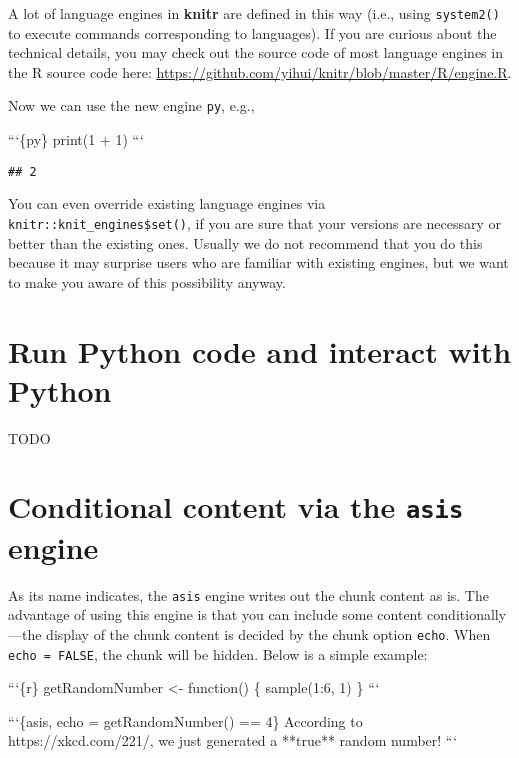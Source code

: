 \documentclass[
  11pt,
]{krantz}
\newenvironment{Shaded}{\begin{snugshade}}{\end{snugshade}}
\newcommand{\BaseNTok}[1]{\textcolor[rgb]{0.06,0.06,0.06}{#1}}
\renewenvironment{quote}{\begin{VF}}{\end{VF}}
\begin{document}
A lot of language engines in \textbf{knitr} are defined in this way (i.e., using \texttt{system2()} to execute commands corresponding to languages). If you are curious about the technical details, you may check out the source code of most language engines in the R source code here: \url{https://github.com/yihui/knitr/blob/master/R/engine.R}.

Now we can use the new engine \texttt{py}, e.g.,

\begin{quote}
\begin{Shaded}
\begin{Highlighting}[]
\BaseNTok{```\{py\}}
\BaseNTok{print(1 + 1)}
\BaseNTok{```}
\end{Highlighting}
\end{Shaded}

\begin{verbatim}
## 2
\end{verbatim}
\end{quote}

You can even override existing language engines via \texttt{knitr::knit\_engines\$set()}, if you are sure that your versions are necessary or better than the existing ones. Usually we do not recommend that you do this because it may surprise users who are familiar with existing engines, but we want to make you aware of this possibility anyway.

\hypertarget{eng-python}{%
\section{Run Python code and interact with Python}\label{eng-python}}

TODO

\hypertarget{eng-asis}{%
\section{\texorpdfstring{Conditional content via the \texttt{asis} engine}{Conditional content via the asis engine}}\label{eng-asis}}

As its name indicates, the \texttt{asis} engine writes out the chunk content as is. The advantage of using this engine is that you can include some content conditionally---the display of the chunk content is decided by the chunk option \texttt{echo}. When \texttt{echo\ =\ FALSE}, the chunk will be hidden. Below is a simple example:

\begin{Shaded}
\begin{Highlighting}[]
\BaseNTok{```\{r\}}
\BaseNTok{getRandomNumber <- function() \{}
\BaseNTok{  sample(1:6, 1)}
\BaseNTok{\}}
\BaseNTok{```}

\BaseNTok{```\{asis, echo = getRandomNumber() == 4\}}
\BaseNTok{According to https://xkcd.com/221/, we just generated}
\BaseNTok{a **true** random number!}
\BaseNTok{```}
\end{Highlighting}
\end{Shaded}
\end{document}

